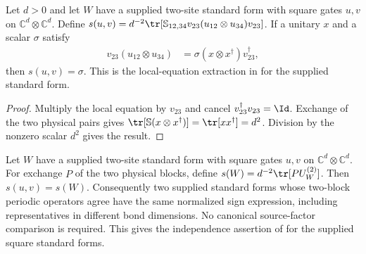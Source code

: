 \begin{lemma}
    \label{lem:mpu_supplied_time_reversal_sign}
    \leanok
    Let $d>0$ and let $W$ have a supplied two-site standard form with square
    gates $u,v$ on $\mathbb C^d\otimes\mathbb C^d$. Define
    $s(u,v)=d^{-2}\tr[\mathbb S_{12,34}v_{23}(u_{12}\otimes u_{34})v_{23}]$.
    If a unitary $x$ and a scalar $\sigma$ satisfy
    \begin{align}
        v_{23}(u_{12}\otimes u_{34})
         & =\sigma(x\otimes x^\dagger)v_{23}^\dagger,
    \end{align}
    then $s(u,v)=\sigma$. This is the local-equation extraction in
    \cite[lines~1595--1610]{Cirac2017MPU} for the supplied standard form.
\end{lemma}

\begin{proof}\leanok
    Multiply the local equation by $v_{23}$ and cancel
    $v_{23}^\dagger v_{23}=\Id$. Exchange of the two physical pairs gives
    $\tr[\mathbb S(x\otimes x^\dagger)]=\tr[xx^\dagger]=d^2$.
    Division by the nonzero scalar $d^2$ gives the result.
\end{proof}

\begin{lemma}
    \label{lem:mpu_source_time_reversal_sign_independent}
    \leanok
    Let $W$ have a supplied two-site standard form with square gates $u,v$
    on $\mathbb C^d\otimes\mathbb C^d$. For exchange $P$ of the two physical
    blocks, define $s(W)=d^{-2}\tr[P U_W^{(2)}]$. Then $s(u,v)=s(W)$.
    Consequently two supplied standard forms whose two-block
    periodic operators agree have the same normalized sign expression,
    including representatives in different bond dimensions. No canonical
    source-factor comparison is required. This gives the independence
    assertion of \cite[lines~1613--1627]{Cirac2017MPU} for the supplied
    square standard forms.
\end{lemma}

